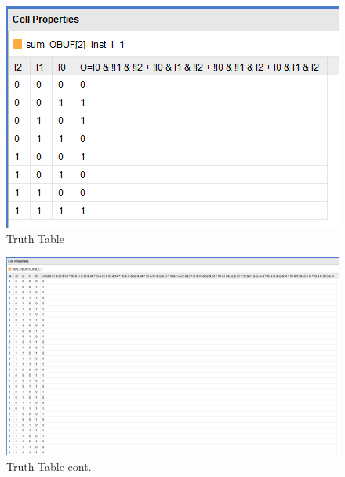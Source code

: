 \documentclass{article}
\begin{document}
\begin{figure}[h]
\begin{center}
\includegraphics[width=1\textwidth]{fourBitAdderTruth2.png} %
\caption{Truth Table}
\end{center}
\end{figure}


\begin{figure}[h]
\begin{center}
\includegraphics[width=1\textwidth]{fourBitAdderTruth3.png} %
\caption{Truth Table cont.}
\end{center}
\end{figure}
\end{document}
